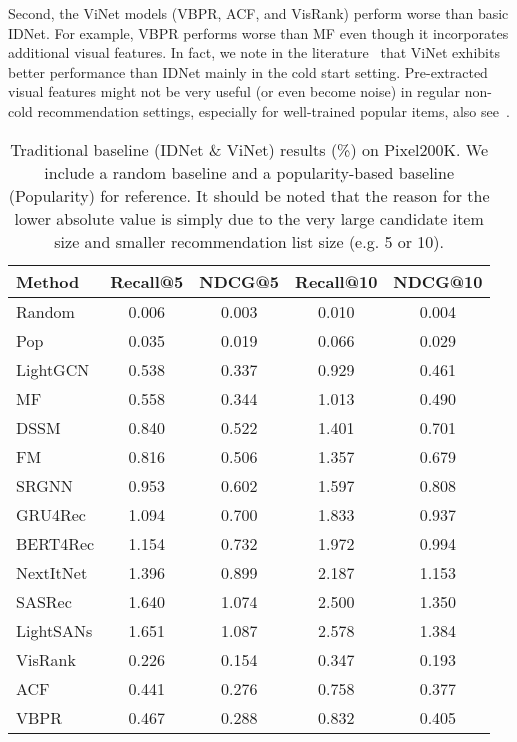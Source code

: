 \documentclass[sigconf]{acmart}
\begin{document}
Second, the ViNet models (VBPR, ACF, and VisRank) perform worse than basic IDNet. For example, VBPR performs worse than MF even though it incorporates  additional visual features.  In fact, we note in the literature~\cite{du2020learn,tang2019adversarial} that  ViNet exhibits better performance than IDNet mainly in the cold start setting. 
Pre-extracted visual features might not be very useful (or even become noise) in regular non-cold recommendation settings, especially for well-trained popular items, also see~\cite{yuan2023go}. 


\begin{table}[t]
	\caption{Traditional  baseline (IDNet \& ViNet) results (\%) on Pixel200K. We include a random  baseline and a popularity-based baseline (Popularity) for reference. It should be noted that the reason for the lower absolute value is simply  due to the very large candidate item size and
smaller recommendation list size (e.g. 5 or 10).} \label{tab:benchmark}
        \begin{center}
	\begin{tabular}{l c c c c }
		\toprule
		Method  & Recall@5 &  NDCG@5 & Recall@10 &  NDCG@10    \\
		\midrule
		Random &0.006 &0.003 &0.010 &0.004 \\
		Pop &0.035 & 0.019&0.066 & 0.029\\
		\midrule
		LightGCN & 0.538 & 0.337 & 0.929 & 0.461\\
		MF & 0.558 & 0.344 & 1.013 & 0.490\\
		DSSM & 0.840 & 0.522 & 1.401 & 0.701\\
		FM & 0.816 & 0.506 & 1.357 & 0.679\\
		\midrule
		SRGNN & 0.953 & 0.602 & 1.597 & 0.808\\
		GRU4Rec & 1.094 & 0.700 & 1.833 & 0.937 \\
		BERT4Rec & 1.154 & 0.732 & 1.972 & 0.994 \\
		NextItNet & 1.396 & 0.899 & 2.187 & 1.153 \\
		SASRec & 1.640 & 1.074 & 2.500 & 1.350 \\			
		LightSANs &1.651 & 1.087&2.578 &1.384 \\
		\midrule
		VisRank & 0.226 & 0.154 & 0.347 & 0.193 \\
		ACF & 0.441 & 0.276 & 0.758 & 0.377\\
		VBPR & 0.467 & 0.288 & 0.832 & 0.405\\	
		\bottomrule
	\end{tabular}
        \end{center}
\end{table}
\end{document}
